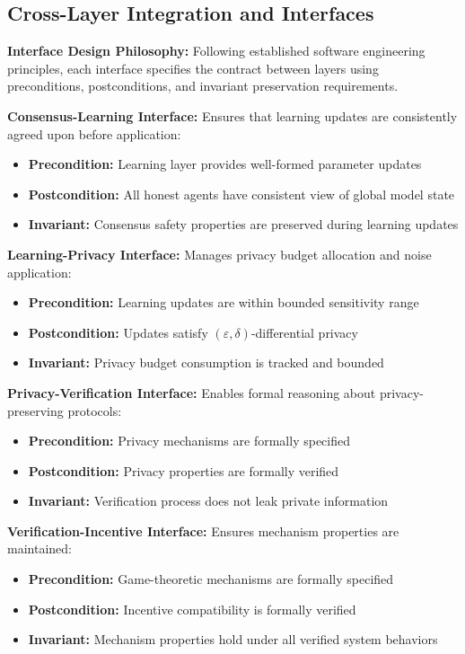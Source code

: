 \documentclass[conference]{IEEEtran}
\begin{document}
\subsection{Cross-Layer Integration and Interfaces}

\textbf{Interface Design Philosophy:} Following established software engineering principles, each interface specifies the contract between layers using preconditions, postconditions, and invariant preservation requirements.

\textbf{Consensus-Learning Interface:} Ensures that learning updates are consistently agreed upon before application:
\begin{itemize}
    \item \textbf{Precondition:} Learning layer provides well-formed parameter updates
    \item \textbf{Postcondition:} All honest agents have consistent view of global model state
    \item \textbf{Invariant:} Consensus safety properties are preserved during learning updates
\end{itemize}

\textbf{Learning-Privacy Interface:} Manages privacy budget allocation and noise application:
\begin{itemize}
    \item \textbf{Precondition:} Learning updates are within bounded sensitivity range
    \item \textbf{Postcondition:} Updates satisfy $(\varepsilon, \delta)$-differential privacy
    \item \textbf{Invariant:} Privacy budget consumption is tracked and bounded
\end{itemize}

\textbf{Privacy-Verification Interface:} Enables formal reasoning about privacy-preserving protocols:
\begin{itemize}
    \item \textbf{Precondition:} Privacy mechanisms are formally specified
    \item \textbf{Postcondition:} Privacy properties are formally verified
    \item \textbf{Invariant:} Verification process does not leak private information
\end{itemize}

\textbf{Verification-Incentive Interface:} Ensures mechanism properties are maintained:
\begin{itemize}
    \item \textbf{Precondition:} Game-theoretic mechanisms are formally specified
    \item \textbf{Postcondition:} Incentive compatibility is formally verified
    \item \textbf{Invariant:} Mechanism properties hold under all verified system behaviors
\end{itemize}
\end{document}
